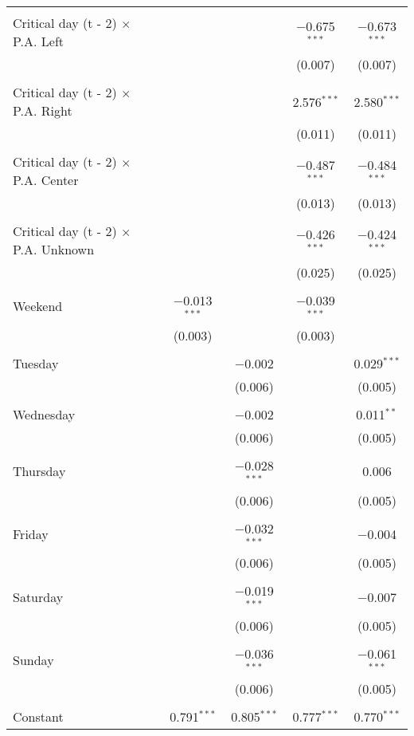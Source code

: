 \documentclass[
]{article}
\begin{document}
\begin{table}[!htbp]
{\begin{tabular}{@{\extracolsep{5pt}}lcccc}
  & & & & \\ 
 Critical day (t - 2) $\times$ P.A. Left &  &  & $-$0.675$^{***}$ & $-$0.673$^{***}$ \\ 
  &  &  & (0.007) & (0.007) \\ 
  & & & & \\ 
 Critical day (t - 2) $\times$ P.A. Right &  &  & 2.576$^{***}$ & 2.580$^{***}$ \\ 
  &  &  & (0.011) & (0.011) \\ 
  & & & & \\ 
 Critical day (t - 2) $\times$ P.A. Center &  &  & $-$0.487$^{***}$ & $-$0.484$^{***}$ \\ 
  &  &  & (0.013) & (0.013) \\ 
  & & & & \\ 
 Critical day (t - 2) $\times$ P.A. Unknown &  &  & $-$0.426$^{***}$ & $-$0.424$^{***}$ \\ 
  &  &  & (0.025) & (0.025) \\ 
  & & & & \\ 
 Weekend & $-$0.013$^{***}$ &  & $-$0.039$^{***}$ &  \\ 
  & (0.003) &  & (0.003) &  \\ 
  & & & & \\ 
 Tuesday &  & $-$0.002 &  & 0.029$^{***}$ \\ 
  &  & (0.006) &  & (0.005) \\ 
  & & & & \\ 
 Wednesday &  & $-$0.002 &  & 0.011$^{**}$ \\ 
  &  & (0.006) &  & (0.005) \\ 
  & & & & \\ 
 Thursday &  & $-$0.028$^{***}$ &  & 0.006 \\ 
  &  & (0.006) &  & (0.005) \\ 
  & & & & \\ 
 Friday &  & $-$0.032$^{***}$ &  & $-$0.004 \\ 
  &  & (0.006) &  & (0.005) \\ 
  & & & & \\ 
 Saturday &  & $-$0.019$^{***}$ &  & $-$0.007 \\ 
  &  & (0.006) &  & (0.005) \\ 
  & & & & \\ 
 Sunday &  & $-$0.036$^{***}$ &  & $-$0.061$^{***}$ \\ 
  &  & (0.006) &  & (0.005) \\ 
  & & & & \\ 
 Constant & 0.791$^{***}$ & 0.805$^{***}$ & 0.777$^{***}$ & 0.770$^{***}$ \\ 

\end{tabular}}
\end{table}
\end{document}
